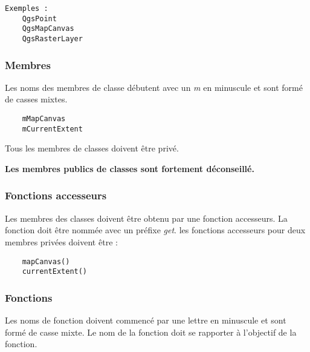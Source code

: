 \begin{verbatim}
Exemples :
	QgsPoint
	QgsMapCanvas
	QgsRasterLayer
\end{verbatim}

\subsubsection{Membres}
Les noms des membres de classe débutent avec un \textit{m} en minuscule et sont formé de casses mixtes.

\begin{verbatim}
	mMapCanvas	
	mCurrentExtent
\end{verbatim}

Tous les membres de classes doivent être privé.

\textbf{Les membres publics de classes sont fortement déconseillé.}

\subsubsection{Fonctions accesseurs}
Les membres des classes doivent être obtenu par une fonction accesseurs. La fonction doit être nommée avec un préfixe \textit{get}. les fonctions accesseurs pour deux membres privées doivent être :
\begin{verbatim}
	mapCanvas()
	currentExtent()
\end{verbatim}

\subsubsection{Fonctions}
Les noms de fonction doivent commencé par une lettre en minuscule et sont formé de casse mixte. Le nom de la fonction doit se rapporter à l'objectif de la fonction.

